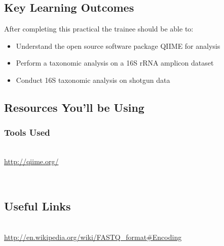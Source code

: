 
\chapter{\moduleTitle}
\newpage

\section{Key Learning Outcomes}

After completing this practical the trainee should be able to:
\begin{itemize}
  \item Understand the open source software package QIIME for analysis
  \item Perform a taxonomic analysis on a 16S rRNA amplicon dataset
  \item Conduct 16S taxonomic analysis on shotgun data 
\end{itemize}

\section{Resources You'll be Using}
 
\subsection{Tools Used}
\begin{description}[style=multiline,labelindent=0cm,align=left,leftmargin=0.5cm]
  \item[QIIME ]\hfill\\
  	\url{http://qiime.org/}
  \item[rRNASelector ]\hfill\\
   	\url{}
\end{description}

\section{Useful Links}
 
\begin{description}[style=multiline,labelindent=0cm,align=left,leftmargin=0.5cm]
  \item[FASTQ Encoding]\hfill\\
    \url{http://en.wikipedia.org/wiki/FASTQ_format#Encoding}
\end{description}

